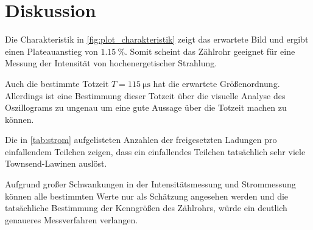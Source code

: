 \section{Diskussion}
\label{sec:Diskussion}

Die Charakteristik in \autoref{fig:plot_charakteristik} zeigt das erwartete Bild und ergibt einen Plateauanstieg von $\SI{1.15}{\percent}$.
Somit scheint das Zählrohr geeignet für eine Messung der Intensität von hochenergetischer Strahlung.

Auch die bestimmte Totzeit $T=\SI{115}{\micro\second}$ hat die erwartete Größenordnung.
Allerdings ist eine Bestimmung dieser Totzeit über die visuelle Analyse des Oszillograms zu ungenau um eine gute Aussage über die Totzeit machen zu können.

Die in \autoref{tab:strom} aufgelisteten Anzahlen der freigesetzten Ladungen pro einfallendem Teilchen zeigen, dass ein einfallendes Teilchen tatsächlich sehr viele Townsend-Lawinen auslöst.

Aufgrund großer Schwankungen in der Intensitätsmessung und Strommessung können alle bestimmten Werte nur als Schätzung angesehen werden und die tatsächliche Bestimmung der Kenngrößen des Zählrohrs, würde ein deutlich genaueres Messverfahren verlangen.